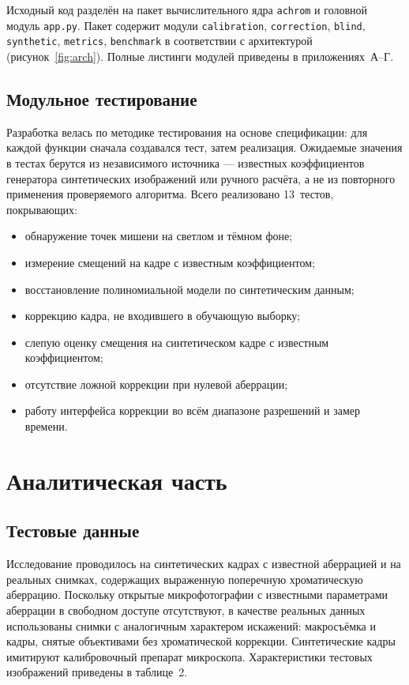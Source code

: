 \documentclass[a4paper,14pt,oneside]{extreport}
\begin{document}
Исходный код разделён на пакет вычислительного ядра \texttt{achrom} и
головной модуль \texttt{app.py}. Пакет содержит модули
\texttt{calibration}, \texttt{correction}, \texttt{blind},
\texttt{synthetic}, \texttt{metrics}, \texttt{benchmark} в соответствии с
архитектурой (рисунок~\ref{fig:arch}). Полные листинги модулей приведены в
приложениях~А–Г.

\subsection{Модульное тестирование}

Разработка велась по методике тестирования на основе спецификации:
для каждой функции сначала создавался тест, затем реализация. Ожидаемые
значения в тестах берутся из независимого источника — известных
коэффициентов генератора синтетических изображений или ручного расчёта,
а не из повторного применения проверяемого алгоритма. Всего реализовано
13~тестов, покрывающих:
\begin{itemize}
\item обнаружение точек мишени на светлом и тёмном фоне;
\item измерение смещений на кадре с известным коэффициентом;
\item восстановление полиномиальной модели по синтетическим данным;
\item коррекцию кадра, не входившего в обучающую выборку;
\item слепую оценку смещения на синтетическом кадре с известным
коэффициентом;
\item отсутствие ложной коррекции при нулевой аберрации;
\item работу интерфейса коррекции во всём диапазоне разрешений и замер
времени.
\end{itemize}

\clearpage
\section{Аналитическая часть}

\subsection{Тестовые данные}

Исследование проводилось на синтетических кадрах с известной аберрацией и
на реальных снимках, содержащих выраженную поперечную хроматическую
аберрацию. Поскольку открытые микрофотографии с известными параметрами
аберрации в свободном доступе отсутствуют, в качестве реальных данных
использованы снимки с аналогичным характером искажений: макросъёмка и
кадры, снятые объективами без хроматической коррекции. Синтетические
кадры имитируют калибровочный препарат микроскопа. Характеристики
тестовых изображений приведены в таблице~2.
\end{document}
